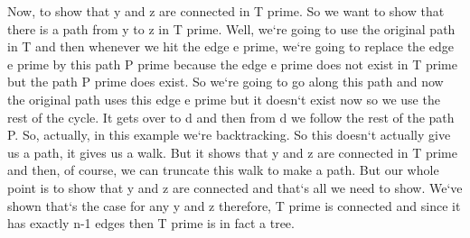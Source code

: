 Now, to show that y and z are connected in T prime.
So we want to show that there is a path from y to z in T prime.
Well, we`re going to use the original path in T and then whenever we hit the edge e prime, we`re going to replace the edge e prime by this path P prime because the edge e prime does not exist in T prime but the path P prime does exist.
So we`re going to go along this path and now the original path uses this edge e prime but it doesn`t exist now so we use the rest of the cycle.
It gets over to d and then from d we follow the rest of the path P\@.
So, actually, in this example we`re backtracking.
So this doesn`t actually give us a path, it gives us a walk.
But it shows that y and z are connected in T prime and then, of course, we can truncate this walk to make a path.
But our whole point is to show that y and z are connected and that`s all we need to show.
We`ve shown that`s the case for any y and z therefore, T prime is connected and since it has exactly n-1 edges then T prime is in fact a tree.

